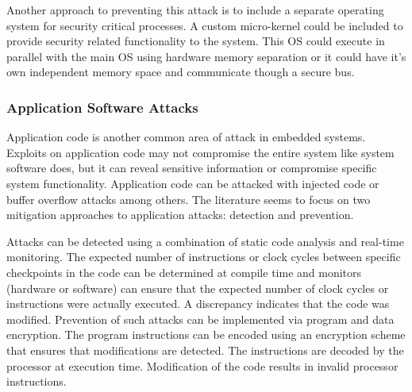 \documentclass[final,conference,11pt]{IEEEtran}
\begin{document}
Another approach to preventing this attack is to include a separate operating system for security critical processes.  A custom micro-kernel could be included to provide security related functionality to the system.  This OS could execute in parallel with the main OS using hardware memory separation or it could have it's own independent memory space and communicate though a secure bus.\cite{Hu2009}

\subsubsection{Application Software Attacks}

Application code is another common area of attack in embedded systems.  Exploits on application code may not compromise the entire system like system software does, but it can reveal sensitive information or compromise specific system functionality.  Application code can be attacked with injected code or buffer overflow attacks among others.  The literature seems to focus on two mitigation approaches to application attacks: detection and prevention.  

Attacks can be detected using a combination of static code analysis and real-time monitoring.  The expected number of instructions or clock cycles between specific checkpoints in the code can be determined at compile time and monitors (hardware or software) can ensure that the expected number of clock cycles or instructions were actually executed.  A discrepancy indicates that the code was modified.  Prevention of such attacks can be implemented via program and data encryption.  The program instructions can be encoded using an encryption scheme that ensures that modifications are detected.  The instructions are decoded by the processor at execution time.  Modification of the code results in invalid processor instructions. \cite{Gelbart2009} \cite{Patel2011}
\end{document}
